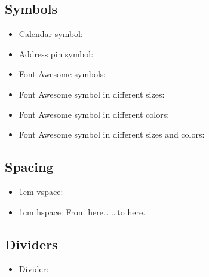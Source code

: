 \documentclass[11pt,letterpaper,sans]{moderncv}
\newcommand{\divider}{\textcolor{color2!30}{\hdashrule{\linewidth}{0.6pt}{0.5ex}}\medskip}
\renewcommand*{\addresssymbol}{{\color{color2}\small\faMapMarker}~}
\newcommand{\calendarsymbol}{{\color{color2}\small\faCalendar}~}
\begin{document}
\subsection{Symbols}
\label{sec:org3897ff7}
\begin{itemize}
\item Calendar symbol: \calendarsymbol
\item Address pin symbol: \addresssymbol
\item Font Awesome symbols: {\faCogs} {\faGraduationCap} {\faGraduationCap} {\faBook} {\faWrench} {\faTrophy} {\faChalkboardTeacher} {\faUsers}
\item Font Awesome symbol in different sizes: {\Huge\faBriefcase} {\huge\faBriefcase} {\Large\faBriefcase} {\large\faBriefcase} {\normalsize\faBriefcase} {\small\faBriefcase} {\footnotesize\faBriefcase} {\scriptsize\faBriefcase} {\tiny\faBriefcase}
\item Font Awesome symbol in different colors: {\color{color1}\faBriefcase} {\color{black}\faBriefcase} {\color{red}\faBriefcase} {\color{darkgrey}\faBriefcase} {\color{orange}\faBriefcase} {\color{burgundy}\faBriefcase} {\color{purple}\faBriefcase} {\color{lightblue}\faBriefcase} {\color{green}\faBriefcase}
\item Font Awesome symbol in different sizes and colors: {\color{color1}\Huge\faBriefcase} {\color{black}\huge\faBriefcase} {\color{red}\Large\faBriefcase} {\color{darkgrey}\large\faBriefcase} {\color{orange}\normalsize\faBriefcase} {\color{burgundy}\small\faBriefcase} {\color{purple}\footnotesize\faBriefcase} {\color{lightblue}\scriptsize\faBriefcase} {\color{green}\tiny\faBriefcase}
\end{itemize}


\subsection{Spacing}
\label{sec:org1a4ba4d}
\begin{itemize}
\item 1cm vspace:
\end{itemize}

\vspace{1cm}

\begin{itemize}
\item 1cm hspace: From here\ldots{} \hspace{1cm} \ldots{}to here.
\end{itemize}


\subsection{Dividers}
\label{sec:org3304ab8}
\begin{itemize}
\item Divider:
\end{itemize}
\divider
\end{document}
